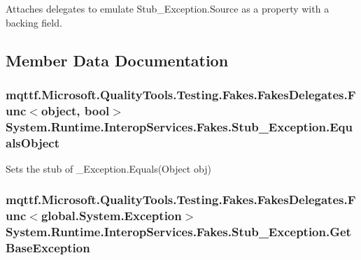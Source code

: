 Attaches delegates to emulate Stub\-\_\-\-Exception.\-Source as a property with a backing field.



\subsection{Member Data Documentation}
\hypertarget{class_system_1_1_runtime_1_1_interop_services_1_1_fakes_1_1_stub___exception_a843cab085a21cd2f9d7f825eae4c94e5}{
\subsubsection[{Equals\-Object}]{\setlength{\rightskip}{0pt plus 5cm}mqttf.\-Microsoft.\-Quality\-Tools.\-Testing.\-Fakes.\-Fakes\-Delegates.\-Func$<$object, bool$>$ System.\-Runtime.\-Interop\-Services.\-Fakes.\-Stub\-\_\-\-Exception.\-Equals\-Object}}\label{class_system_1_1_runtime_1_1_interop_services_1_1_fakes_1_1_stub___exception_a843cab085a21cd2f9d7f825eae4c94e5}


Sets the stub of \-\_\-\-Exception.\-Equals(\-Object obj)

\hypertarget{class_system_1_1_runtime_1_1_interop_services_1_1_fakes_1_1_stub___exception_af4ba5a18c093a2dde16a6e934ee1fb9b}{
\subsubsection[{Get\-Base\-Exception}]{\setlength{\rightskip}{0pt plus 5cm}mqttf.\-Microsoft.\-Quality\-Tools.\-Testing.\-Fakes.\-Fakes\-Delegates.\-Func$<$global.\-System.\-Exception$>$ System.\-Runtime.\-Interop\-Services.\-Fakes.\-Stub\-\_\-\-Exception.\-Get\-Base\-Exception}}\label{class_system_1_1_runtime_1_1_interop_services_1_1_fakes_1_1_stub___exception_af4ba5a18c093a2dde16a6e934ee1fb9b}


